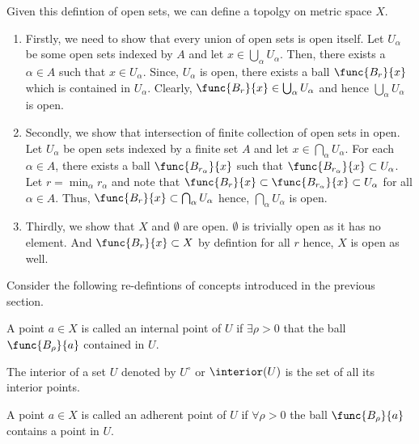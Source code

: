 Given this defintion of open sets, we can define a topolgy on metric space \(X\).
\begin{enumerate}
    \item Firstly, we need to show that every union of open sets is open itself. Let \(U_{\alpha}\) be some open sets indexed by \(A\) and let \(x \in \bigcup_{\alpha} U_{\alpha}\). Then, there exists a \(\alpha \in A\) such that \(x \in U_{\alpha}\). Since, \(U_{\alpha}\) is open, there exists a ball \(\func{B_r}{x}\) which is contained in \(U_{\alpha}\). Clearly, \(\func{B_r}{x} \in \bigcup_{\alpha} U_{\alpha}\) and hence \(\bigcup_{\alpha} U_{\alpha}\) is open.
    \item Secondly, we show that intersection of finite collection of open sets in open. Let \(U_{\alpha}\) be open sets indexed by a finite set \(A\) and let \(x \in \bigcap_{\alpha} U_{\alpha}\). For each \(\alpha \in A\), there exists a ball \(\func{B_{r_{\alpha}}}{x}\) such that \(\func{B_{r_{\alpha}}}{x} \subset U_{\alpha}\). Let \(r = \min_{\alpha} r_{\alpha}\) and note that \(\func{B_r}{x} \subset \func{B_{r_{\alpha}}}{x} \subset U_{\alpha}\) for all \(\alpha \in A\). Thus, \(\func{B_{r}}{x} \subset \bigcap_{\alpha} U_{\alpha}\) hence, \(\bigcap_{\alpha} U_{\alpha}\) is open.
    \item Thirdly, we show that \(X\) and \(\emptyset\) are open. \(\emptyset\) is trivially open as it has no element. And \(\func{B_r}{x} \subset X\)  by defintion for all \(r\) hence, \(X\) is open as well.
\end{enumerate}

Consider the following re-defintions of concepts introduced in the previous section.

\begin{definition} 
    A point \(a \in X\) is called an internal point of \(U\) if \(\exists \rho > 0\) that the ball \(\func{B_\rho}{a}\) contained in \(U\).
\end{definition}

\begin{definition} [Interior]
    The interior of a set \(U\) denoted by \(U^\circ\) or \(\interior (U)\) is the set of all its interior points.
\end{definition}

\begin{definition} 
    A point \(a \in X\) is called an adherent point of \(U\) if \(\forall \rho > 0\) the ball \(\func{B_\rho}{a}\) contains a point in \(U\).
\end{definition}

